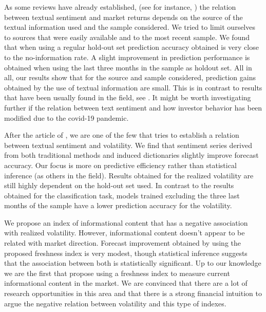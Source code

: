 \documentclass[a4paper, 12pt]{report}
\begin{document}
    As some reviews have already established, (see for instance, \textcite{Nassirtoussi:2014}) the relation between textual sentiment and market returns depends on the source of the textual information used and the sample considered. We tried to limit ourselves to sources that were easily available and to the most recent sample. We found that when using a regular hold-out set prediction accuracy obtained is very close to the no-information rate. A slight improvement in prediction performance is obtained when using the last three months in the sample as holdout set. All in all, our results show that for the source and sample considered, prediction gains obtained by the use of textual information are small. This is in contrast to results that have been usually found in the field, see \textcite{Kearney:2014}. It might be worth investigating further if the relation between text sentiment and how investor behavior has been modified due to the covid-19 pandemic. 
    
    After the article of \textcite{Antweiler:2004}, we are one of the few that tries to establish a relation between textual sentiment and volatility. We find that sentiment series derived from both traditional methods and induced dictionaries slightly improve forecast accuracy. Our focus is more on predictive efficiency rather than statistical inference (as others in the field). Results obtained for the realized volatility are still highly dependent on the hold-out set used. In contrast to the results obtained for the classification task, models trained excluding the three last months of the sample have a lower prediction accuracy for the volatility. 
    
    We propose an index of informational content that has a negative association with realized volatility. However, informational content doesn't appear to be related with market direction. Forecast improvement obtained by using the proposed freshness index is very modest, though statistical inference suggests that the association between both is statistically significant. Up to our knowledge we are the first that propose using a freshness index to measure current informational content in the market. We are convinced that there are a lot of research opportunities in this area and that there is a strong financial intuition to argue the negative relation between volatility and this type of indexes.  
    
\end{document}
